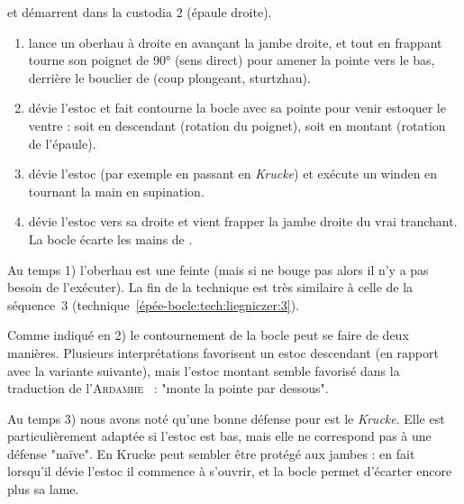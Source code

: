 \begin{technique}[Liegniczer 5]
\label{épée-bocle:tech:liegniczer:5}

\A et \D démarrent dans la custodia 2 (épaule droite).

\begin{enumerate}
	\item \A lance un oberhau à droite en avançant la jambe droite, et tout en frappant tourne son poignet de 90° (sens direct) pour amener la pointe vers le bas, derrière le bouclier de \D (coup plongeant, sturtzhau).
	
	\item {}
		\D dévie l'estoc et \A fait contourne la bocle avec sa pointe pour venir estoquer le ventre : soit en descendant (rotation du poignet), soit en montant (rotation de l'épaule).
	
	\item {}
		\D dévie l'estoc (par exemple en passant en \emph{Krucke}) et \A exécute un winden en tournant la main en supination.
	
	\item {}
		\D dévie l'estoc vers sa droite et \A vient frapper la jambe droite du vrai tranchant.
		La bocle écarte les mains de \D.
\end{enumerate}

Au temps 1) l'oberhau est une feinte (mais si \D ne bouge pas alors il n'y a pas besoin de l'exécuter).
La fin de la technique est très similaire à celle de la séquence~3 (technique~\ref{épée-bocle:tech:liegniczer:3}).

Comme indiqué en 2) le contournement de la bocle peut se faire de deux manières.
Plusieurs interprétations favorisent un estoc descendant (en rapport avec la variante suivante), mais l'estoc montant semble favorisé dans la traduction de l'\textsc{Ardamhe}~\cite{ardamhe:liegniczer} : "monte la pointe par dessous".

Au temps 3) nous avons noté qu'une bonne défense pour \D est le \emph{Krucke}.
Elle est particulièrement adaptée si l'estoc est bas, mais elle ne correspond pas à une défense "naïve".
En Krucke \D peut sembler être protégé aux jambes : en fait lorsqu'il dévie l'estoc il commence à s'ouvrir, et la bocle permet d'écarter encore plus sa lame.

\end{technique}



